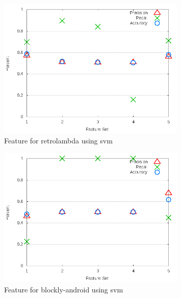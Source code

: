 \begin{figure}[!t]
\centering
\includegraphics[width=0.8\textwidth]{images/svm/test_3/retrolambda_sample_range.png}
\caption{Feature for retrolambda using \gls{svm}}
\label{fig:test_3_retrolambda_svm}
\end{figure}

\begin{figure}[!t]
\centering
\includegraphics[width=0.8\textwidth]{images/svm/test_3/blockly-android_sample_range.png}
\caption{Feature for blockly-android using \gls{svm}}
\label{fig:test_3_blockly-android_svm}
\end{figure}


